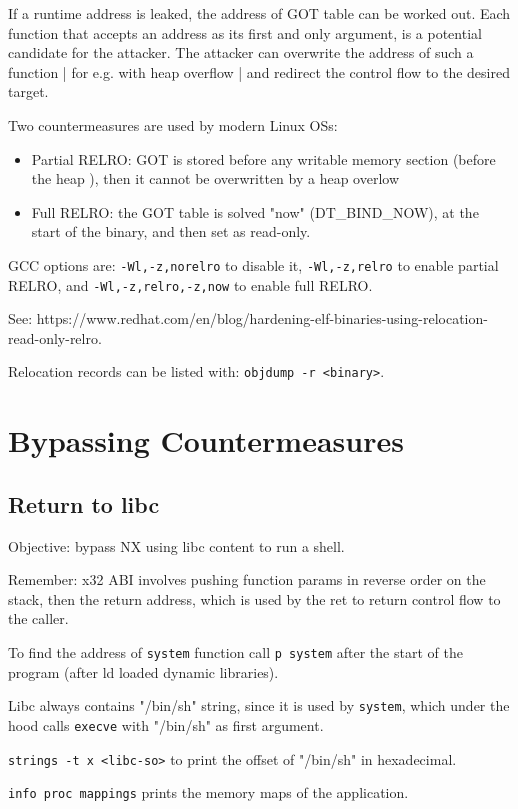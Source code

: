 If a runtime address is leaked, the address of GOT table can be worked out.
Each function that accepts an address as its first and only argument, is a potential candidate for the attacker.
The attacker can overwrite the address of such a function | for e.g. with heap overflow | and redirect the control flow to the desired target.

Two countermeasures are used by modern Linux OSs:
\begin{itemize}
  \item Partial RELRO: GOT is stored before any writable memory section (before the heap ), then it cannot be overwritten by a heap overlow
  \item Full RELRO: the GOT table is solved "now" (DT_BIND_NOW), at the start of the binary, and then set as read-only.
\end{itemize}

GCC options are: \texttt{-Wl,-z,norelro} to disable it, \texttt{-Wl,-z,relro} to enable partial RELRO, and \texttt{-Wl,-z,relro,-z,now} to enable full RELRO.

See: https://www.redhat.com/en/blog/hardening-elf-binaries-using-relocation-read-only-relro.

Relocation records can be listed with: \texttt{objdump -r <binary>}.

\section{Bypassing Countermeasures}
\subsection{Return to libc}
Objective: bypass NX using libc content to run a shell.

Remember: x32 ABI involves pushing function params in reverse order on the stack, then the return address, which is used by the ret to return control flow to the caller.

To find the address of \texttt{system} function call \texttt{p system} after the start of the program (after ld loaded dynamic libraries).

Libc always contains "/bin/sh" string, since it is used by \texttt{system}, which under the hood calls \texttt{execve} with "/bin/sh" as first argument.

\texttt{strings -t x <libc-so>} to print the offset of "/bin/sh" in hexadecimal.

\texttt{info proc mappings} prints the memory maps of the application.

